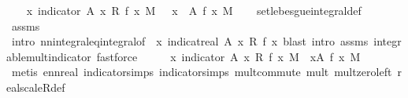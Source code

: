 \begin{isabellebody}
%
\isadelimproof
%
\endisadelimproof
%
\isatagproof
{}\isamarkupfalse%
{\isacharminus}{\kern0pt}\isanewline
\ \ \isamarkupfalse%
\ {\isachardoublequoteopen}{\isacharparenleft}{\kern0pt}{\isasymintegral}\isactrlsup {\isacharplus}{\kern0pt}x{\isachardot}{\kern0pt}\ indicator\ A\ x\ {\isacharasterisk}{\kern0pt}\isactrlsub R\ f\ x\ {\isasympartial}M{\isacharparenright}{\kern0pt}\ {\isacharequal}{\kern0pt}\ {\isacharparenleft}{\kern0pt}{\isasymintegral}\ x\ {\isasymin}\ A{\isachardot}{\kern0pt}\ f\ x\ {\isasympartial}M{\isacharparenright}{\kern0pt}{\isachardoublequoteclose}\isanewline
\ \ \isamarkupfalse%
\ set{\isacharunderscore}{\kern0pt}lebesgue{\isacharunderscore}{\kern0pt}integral{\isacharunderscore}{\kern0pt}def\ \isamarkupfalse%
\ assms{\isacharparenleft}{\kern0pt}{}{\isacharparenright}{\kern0pt}\ \isamarkupfalse%
\ {\isacharparenleft}{\kern0pt}intro\ nn{\isacharunderscore}{\kern0pt}integral{\isacharunderscore}{\kern0pt}eq{\isacharunderscore}{\kern0pt}integral{\isacharbrackleft}{\kern0pt}of\ {\isacharunderscore}{\kern0pt}\ {\isachardoublequoteopen}{\isasymlambda}x{\isachardot}{\kern0pt}\ indicat{\isacharunderscore}{\kern0pt}real\ A\ x\ {\isacharasterisk}{\kern0pt}\isactrlsub R\ f\ x{\isachardoublequoteclose}{\isacharbrackright}{\kern0pt}{\isacharcomma}{\kern0pt}\ blast\ intro{\isacharcolon}{\kern0pt}\ assms\ integrable{\isacharunderscore}{\kern0pt}mult{\isacharunderscore}{\kern0pt}indicator{\isacharcomma}{\kern0pt}\ fastforce{\isacharparenright}{\kern0pt}\isanewline
\ \ \isamarkupfalse%
\ \isamarkupfalse%
\ {\isachardoublequoteopen}{\isacharparenleft}{\kern0pt}{\isasymintegral}\isactrlsup {\isacharplus}{\kern0pt}x{\isachardot}{\kern0pt}\ indicator\ A\ x\ {\isacharasterisk}{\kern0pt}\isactrlsub R\ f\ x\ {\isasympartial}M{\isacharparenright}{\kern0pt}\ {\isacharequal}{\kern0pt}\ {\isacharparenleft}{\kern0pt}{\isasymintegral}\isactrlsup {\isacharplus}{\kern0pt}x{\isasymin}A{\isachardot}{\kern0pt}\ f\ x\ {\isasympartial}M{\isacharparenright}{\kern0pt}{\isachardoublequoteclose}\ \ \isamarkupfalse%
\ {\isacharparenleft}{\kern0pt}metis\ ennreal{\isacharunderscore}{\kern0pt}{}\ indicator{\isacharunderscore}{\kern0pt}simps{\isacharparenleft}{\kern0pt}{}{\isacharparenright}{\kern0pt}\ indicator{\isacharunderscore}{\kern0pt}simps{\isacharparenleft}{\kern0pt}{}{\isacharparenright}{\kern0pt}\ mult{\isachardot}{\kern0pt}commute\ mult{\isacharunderscore}{\kern0pt}{}\ mult{\isacharunderscore}{\kern0pt}zero{\isacharunderscore}{\kern0pt}left\ real{\isacharunderscore}{\kern0pt}scaleR{\isacharunderscore}{\kern0pt}def{\isacharparenright}{\kern0pt}\isanewline

\end{isabellebody}
